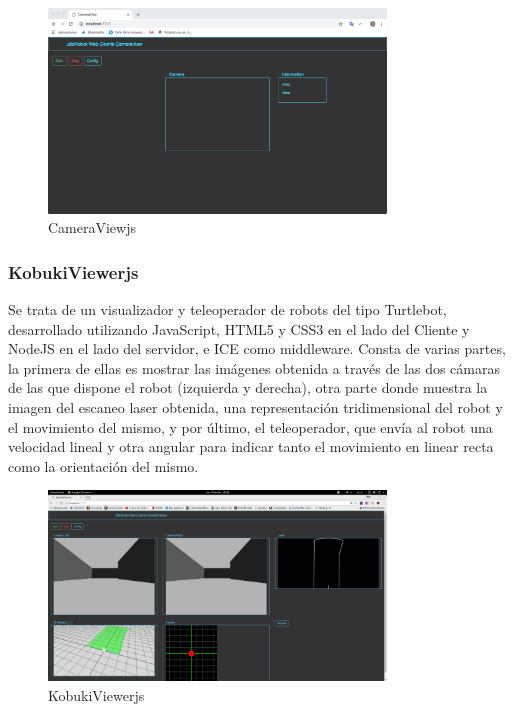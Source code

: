 \begin{figure}[H]
  \begin{center}
    \includegraphics[width=0.8\textwidth]{figures/cameraviewjs.png}
		\caption{CameraViewjs}
		\label{fig.cameraviewjs}
		\end{center}
\end{figure}

\subsubsection{KobukiViewerjs}

Se trata de un visualizador y teleoperador de robots del tipo Turtlebot, desarrollado utilizando JavaScript, HTML5 y CSS3 en el lado del Cliente y NodeJS en el lado del servidor, e ICE como middleware. Consta de varias partes, la primera de ellas es mostrar las imágenes obtenida a través de las dos cámaras de las que dispone el robot (izquierda y derecha), otra parte donde muestra la imagen del escaneo laser obtenida, una representación tridimensional del robot y el movimiento del mismo, y por último, el teleoperador, que envía al robot una velocidad lineal y otra angular para indicar tanto el movimiento en linear recta como la orientación del mismo.

\begin{figure}[H]
  \begin{center}
    \includegraphics[width=0.8\textwidth]{figures/kobukiviewerjs.png}
		\caption{KobukiViewerjs}
		\label{fig.kobukiviewerjs}
		\end{center}
\end{figure}


